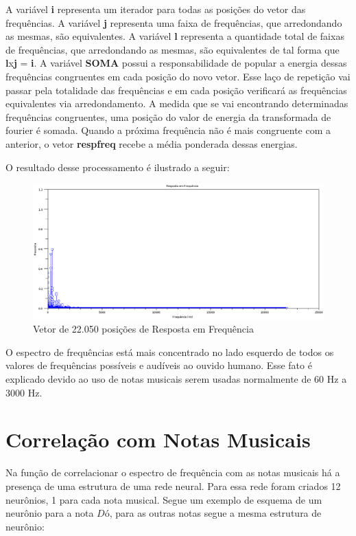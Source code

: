 A variável \textbf{i} representa um iterador para todas as posições do vetor das frequências. A variável \textbf{j} representa uma faixa de frequências, que arredondando as mesmas, são equivalentes. A variável \textbf{l} representa a quantidade total de faixas de frequências, que arredondando as mesmas, são equivalentes de tal forma que \textbf{l}x\textbf{j} = \textbf{i}. A variável \textbf{SOMA} possui a responsabilidade de popular a energia dessas frequências congruentes em cada posição do novo vetor. Esse laço de repetição vai passar pela totalidade das frequências e em cada posição verificará as frequências equivalentes via arredondamento. A medida que se vai encontrando determinadas frequências congruentes, uma posição do valor de energia da transformada de fourier é somada. Quando a próxima frequência não é mais congruente com a anterior, o vetor \textbf{respfreq} recebe a média ponderada dessas energias.

O resultado desse processamento é ilustrado a seguir:

\begin{figure}[h]
	\centering
		\includegraphics[keepaspectratio=true,scale=0.45]{figuras/fft-resultado}
	\caption{Vetor de 22.050 posições de Resposta em Frequência}
\end{figure}

O espectro de frequências está mais concentrado no lado esquerdo de todos os valores de frequências possíveis e audíveis ao ouvido humano. Esse fato é explicado devido ao uso de notas musicais serem usadas normalmente de 60 Hz a 3000 Hz.

\newpage
\section{Correlação com Notas Musicais}
\label{sec:correlacaonotas}

Na função de correlacionar o espectro de frequência com as notas musicais há a presença de uma estrutura de uma rede neural. Para essa rede foram criados 12 neurônios, 1 para cada nota musical. Segue um exemplo de esquema de um neurônio para a nota $Dó$, para as outras notas segue a mesma estrutura de neurônio:

